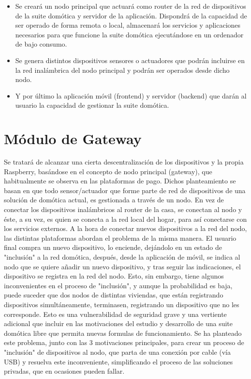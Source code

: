 \begin{itemize}

\item Se creará un nodo principal que actuará como router de la red de dispositivos de la suite domótica y servidor de la aplicación. Dispondrá de la capacidad de ser operado de forma remota o local, almacenará los servicios y aplicaciones necesarios para que funcione la suite domótica ejecutándose en un ordenador de bajo consumo.

\item Se genera distintos dispositivos sensores o actuadores que podrán incluirse en la red inalámbrica del nodo principal y podrán ser operados desde dicho nodo.

\item Y por último la aplicación móvil (frontend) y servidor (backend) que darán al usuario la capacidad de gestionar la suite domótica.

\end{itemize}

\section{Módulo de Gateway}
\label{ch:Capitulo3.2}

Se tratará de alcanzar una cierta descentralización de los dispositivos y la propia Raspberry, basándose en el concepto de nodo principal (gateway), que habitualmente se observa en las plataformas de pago. Dichos planteamiento se basan en que todo sensor/actuador que forme parte de red de dispositivos de una solución de domótica actual, es gestionada a través de un nodo. En vez de conectar los dispositivos inalámbricos al router de la casa, se conectan al nodo y éste, a su vez, es quien se conecta a la red local del hogar, para así conectarse con los servicios externos. A la hora de conectar nuevos dispositivos a la red del nodo, las distintas plataformas abordan el problema de la misma manera. El usuario final compra un nuevo dispositivo, lo enciende, dejándolo en un estado de "inclusión" a la red domótica, después, desde la aplicación de móvil, se indica al nodo que se quiere añadir un nuevo dispositivo, y tras seguir las indicaciones, el dispositivo se registra en la red del nodo. Esto, sin embargo, tiene algunos inconvenientes en el proceso de "inclusión", y aunque la probabilidad es baja, puede suceder que dos nodos de distintas viviendas, que están registrando dispositivos simultáneamente, terminasen, registrando un dispositivo que no les corresponde. Esto es una vulnerabilidad de seguridad grave y una vertiente adicional que incluir en las motivaciones del estudio y desarrollo de una suite domótica libre que permita nuevas formulas de funcionamiento. Se ha planteado este problema, junto con las 3 motivaciones principales, para crear un proceso de "inclusión" de dispositivos al nodo, que parta de una conexión por cable (vía USB) y resuelva este inconveniente, simplificando el proceso de las soluciones privadas, que en ocasiones pueden fallar.

